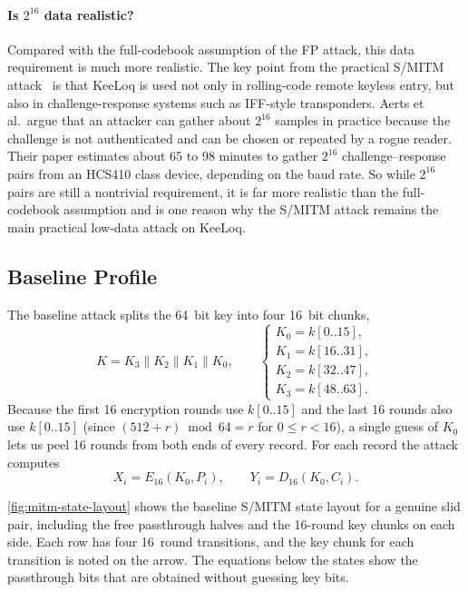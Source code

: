 \documentclass[version=preprint]{iacrcc}
\begin{document}
\paragraph{Is $2^{16}$ data realistic?}
Compared with the full-codebook assumption of the FP attack, this data requirement is much more realistic.
The key point from the practical S/MITM attack~\cite{indesteege2008practical} is that KeeLoq is used not only in rolling-code remote keyless entry, but also in challenge-response systems such as IFF-style transponders.
Aerts et al.\ argue that an attacker can gather about $2^{16}$ samples in practice because the challenge is not authenticated and can be chosen or repeated by a rogue reader.
Their paper estimates about 65 to 98 minutes to gather $2^{16}$ challenge--response pairs from an HCS410 class device, depending on the baud rate.
So while $2^{16}$ pairs are still a nontrivial requirement, it is far more realistic than the full-codebook assumption and is one reason why the S/MITM attack remains the main practical low-data attack on KeeLoq.

\subsection{Baseline Profile}

The baseline attack splits the 64~bit key into four 16~bit chunks,
\[
K = K_3 \| K_2 \| K_1 \| K_0,
\qquad
\begin{cases}
K_0 = k[0..15], \\
K_1 = k[16..31], \\
K_2 = k[32..47], \\
K_3 = k[48..63].
\end{cases}
\]
Because the first 16 encryption rounds use $k[0..15]$ and the last 16 rounds also use $k[0..15]$ (since $(512{+}r) \bmod 64 = r$ for $0 \leq r < 16$), a single guess of $K_0$ lets us peel 16 rounds from both ends of every record.
For each record the attack computes
\[
X_i = E_{16}(K_0,P_i),
\qquad
Y_i = D_{16}(K_0,C_i).
\]

\autoref{fig:mitm-state-layout} shows the baseline S/MITM state layout for a genuine slid pair, including the free passthrough halves and the 16-round key chunks on each side.
Each row has four 16~round transitions, and the key chunk for each transition is noted on the arrow.
The equations below the states show the passthrough bits that are obtained without guessing key bits.
\end{document}
